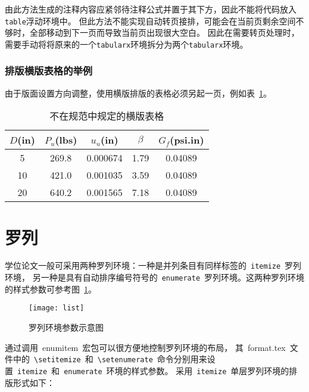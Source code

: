 由此方法生成的注释内容应紧邻待注释公式并置于其下方，因此不能将代码放入\verb|table|浮动环境中。
但此方法不能实现自动转页接排，可能会在当前页剩余空间不够时，全部移动到下一页而导致当前页出现很大空白。
因此在需要转页处理时，需要手动将将原来的一个\verb|tabularx|环境拆分为两个\verb|tabularx|环境。

\subsubsection{排版横版表格的举例}
由于版面设置方向调整，使用横版排版的表格必须另起一页，例如表~\ref{table4}。

\begin{table}[p]
  \centering
  \begin{sideways}
    \begin{minipage}{\textheight}
      \caption{不在规范中规定的横版表格}
      \label{table4}
      \vspace{0.5em}\centering\wuhao
      \begin{tabular}{ccccc}
        \toprule[1.5pt]
        $D$(in) & $P_u$(lbs) & $u_u$(in) & $\beta$ & $G_f$(psi.in) \\
        \midrule[1pt]
        5       & 269.8      & 0.000674  & 1.79    & 0.04089       \\
        10      & 421.0      & 0.001035  & 3.59    & 0.04089       \\
        20      & 640.2      & 0.001565  & 7.18    & 0.04089       \\
        \bottomrule[1.5pt]
      \end{tabular}
    \end{minipage}
  \end{sideways}
\end{table}

\section{罗列}
学位论文一般可采用两种罗列环境：一种是并列条目有同样标签的~\verb|itemize|~罗列环境，
另一种是具有自动排序编号符号的~\verb|enumerate|~罗列环境。这两种罗列环境的样式参数可参考图~\ref{list}。
\begin{figure}[htbp]
  \centering
  \texttt{[image: list]}
  \caption{罗列环境参数示意图}
  \label{list}
  \vspace{-1em}
\end{figure}

通过调用~enumitem~宏包可以很方便地控制罗列环境的布局，
其~format.tex~文件中的~\verb|\setitemize|~和~\verb|\setenumerate|~命令分别用来设置~\verb|itemize|~和~\verb|enumerate|~环境的样式参数。
采用~\verb|itemize|~单层罗列环境的排版形式如下：

